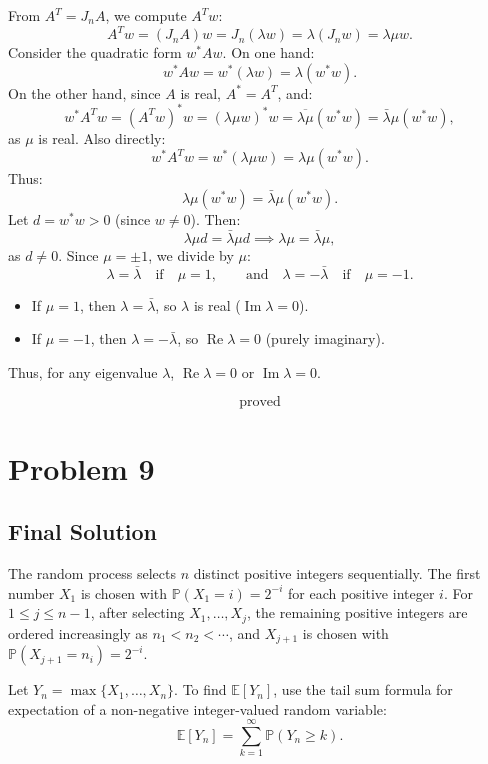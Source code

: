 \documentclass[12pt,a4paper]{article}
\theoremstyle{definition}
\begin{document}
    From $A^T = J_n A$, we compute $A^T w$:
    \[
        A^T w = (J_n A) w = J_n (\lambda w) = \lambda (J_n w) = \lambda \mu w.
    \]
    Consider the quadratic form $w^* A w$. On one hand:
    \[
        w^* A w = w^* (\lambda w) = \lambda (w^* w).
    \]
    On the other hand, since $A$ is real, $A^* = A^T$, and:
    \[
        w^* A^T w = (A^T w)^* w = (\lambda \mu w)^* w = \overline{\lambda \mu} (w^* w) = \bar{\lambda} \mu (w^* w),
    \]
    as $\mu$ is real. Also directly:
    \[
        w^* A^T w = w^* (\lambda \mu w) = \lambda \mu (w^* w).
    \]
    Thus:
    \[
        \lambda \mu (w^* w) = \bar{\lambda} \mu (w^* w).
    \]
    Let $d = w^* w > 0$ (since $w \neq 0$). Then:
    \[
        \lambda \mu d = \bar{\lambda} \mu d \implies \lambda \mu = \bar{\lambda} \mu,
    \]
    as $d \neq 0$. Since $\mu = \pm 1$, we divide by $\mu$:
    \[
        \lambda = \bar{\lambda} \quad \text{if} \quad \mu = 1, \qquad \text{and} \quad \lambda = -\bar{\lambda} \quad \text{if} \quad \mu = -1.
    \]
    \begin{itemize}
        \item If $\mu = 1$, then $\lambda = \bar{\lambda}$, so $\lambda$ is real ($\operatorname{Im} \lambda = 0$).
        \item If $\mu = -1$, then $\lambda = -\bar{\lambda}$, so $\operatorname{Re} \lambda = 0$ (purely imaginary).
    \end{itemize}

    Thus, for any eigenvalue $\lambda$, $\operatorname{Re} \lambda = 0$ or $\operatorname{Im} \lambda = 0$.

    \[\boxed{\text{proved}}\]

\section{Problem 9}
\subsection{Final Solution}
    The random process selects $n$ distinct positive integers sequentially. The first number $X_1$ is chosen with $\mathbb{P}(X_1 = i) = 2^{-i}$ for each positive integer $i$. For $1 \leq j \leq n-1$, after selecting $X_1, \ldots, X_j$, the remaining positive integers are ordered increasingly as $n_1 < n_2 < \cdots$, and $X_{j+1}$ is chosen with $\mathbb{P}(X_{j+1} = n_i) = 2^{-i}$.

    Let $Y_n = \max\{X_1, \ldots, X_n\}$. To find $\mathbb{E}[Y_n]$, use the tail sum formula for expectation of a non-negative integer-valued random variable:
    \begin{equation}
        \mathbb{E}[Y_n] = \sum_{k=1}^{\infty} \mathbb{P}(Y_n \geq k).
    \end{equation}
\end{document}
